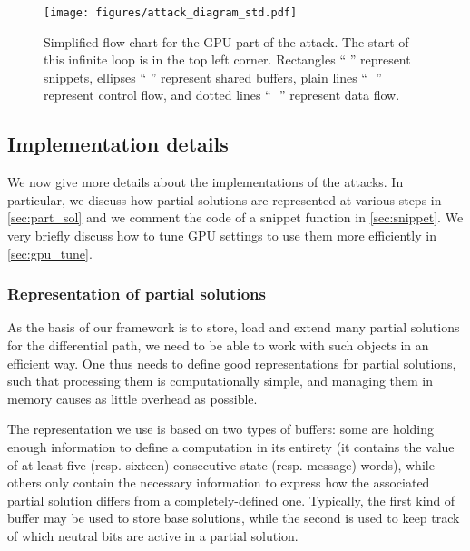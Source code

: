 \begin{figure}[htb]
  \begin{center}
  \texttt{[image: figures/attack\_diagram\_std.pdf]}
  \end{center}
  \caption[Simplified flow chart for the GPU part of the attack.]{Simplified flow chart for the GPU part of the attack. The start of this infinite loop is
  in the top left corner. Rectangles ``\,\protect\rectanMac\,'' represent
  snippets, ellipses ``\,\protect\elliMac\,''
  represent shared buffers, plain lines ``\,\protect\plainMac~''
  represent control flow, and dotted lines ``\,\protect\dottMac~'' represent data flow.}
  \label{fig:attack_diagram}
\end{figure}


\subsection{Implementation details}

We now give more details about the implementations of the attacks. In particular, we discuss
how partial solutions are represented at various steps in \autoref{sec:part_sol} and
we comment the code of a snippet function in \autoref{sec:snippet}. We very briefly discuss how
to tune GPU settings to use them more efficiently in \autoref{sec:gpu_tune}.

\subsubsection{Representation of partial solutions}
\label{sec:part_sol}

As the basis of our framework is to store, load and extend many partial solutions for the differential path, we need to be able to work with such objects
in an efficient way. One thus needs to define good representations for partial solutions, such that processing them is computationally simple, and managing them
in memory causes as little overhead as possible.

The representation we use is based on two types of buffers: some are holding enough information to define a \sha computation in its entirety (\ie it
contains the value of at least five (resp. sixteen) consecutive state (resp. message) words), while others only contain the necessary information to
express how the associated partial solution differs from a completely-defined one. Typically, the first kind of buffer may be used to store base solutions,
while the second is used to keep track of which neutral bits are active in a partial solution.

